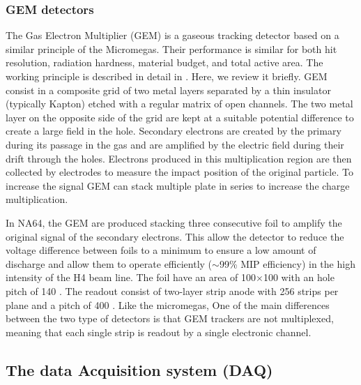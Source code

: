   \subsubsection{GEM detectors}
  \label{ch2:sec:gem}
  The Gas Electron Multiplier (GEM) is a gaseous tracking detector based on a similar principle of the Micromegas. Their performance is similar for both hit resolution, radiation hardness, material budget, and total active area. The working principle is described in detail in \cite{gem,SAULI20162,ABBON2007455}. Here, we review it briefly. GEM consist in a composite grid of two metal layers separated by a thin insulator (typically Kapton) etched with a regular matrix of open channels. The two metal layer on the opposite side of the grid are kept at a suitable potential difference to create a large field in the hole. Secondary electrons are created by the primary during its passage in the gas and are amplified by the electric field during their drift through the holes. Electrons produced in this multiplication region are then collected by electrodes to measure the impact position of the original particle. To increase the signal GEM can stack multiple plate in series to increase the charge multiplication.

  In NA64, the GEM are produced stacking three consecutive foil to amplify the original signal of the secondary electrons. This allow the detector to reduce the voltage difference between foils to a minimum to ensure a low amount of discharge and allow them to operate efficiently ($\sim$99\% MIP efficiency) in the high intensity of the H4 beam line. The foil have an area of 100$\times$100 \mms with an hole pitch of 140 \mum. The readout consist of two-layer strip anode with 256 strips per plane and a pitch of 400 \mum. Like the micromegas,
  One of the main differences between the two type of detectors is that GEM trackers are not multiplexed, meaning that each single strip is readout by a single electronic channel.

\subsection{The data Acquisition system (DAQ)}
\label{ch2:sec:daq}




